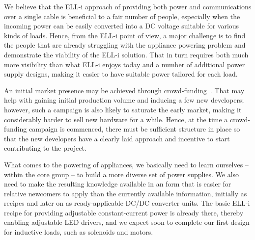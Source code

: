 \documentclass[final]{siamltex}
\begin{document}
We believe that the ELL-i approach of providing both power and
communications over a single cable is beneficial to a fair number of
people, especially when the incoming power can be easily converted
into a DC voltage suitable for various kinds of loads.  Hence, from
the ELL-i point of view, a major challenge is to find the people that
are already struggling with the appliance powering problem and
demonstrate the viability of the ELL-i solution.  That in turn
requires both much more visibility than what ELL-i enjoys today and a
number of additional power supply designs, making it easier to have
suitable power tailored for each load.

An initial market presence may be achieved through
crowd-funding~\cite{kuppuswamy2013crowdfunding}.  That may help
with gaining initial production volume and inducing a few new
developers; however, such a campaign is also likely to saturate the
early market, making it considerably harder to sell new hardware for a
while.  Hence, at the time a crowd-funding campaign is commenced,
there must be sufficient structure in place so that the new developers
have a clearly laid approach and incentive to start contributing to
the project.

What comes to the powering of appliances, we basically need to learn
ourselves -- within the core group -- to build a more diverse set of
power supplies.  We also need to make the resulting knowledge
available in an form that is easier for relative newcomers to apply
than the currently available information, initially as recipes and
later on as ready-applicable DC/DC converter units.  The basic ELL-i
recipe for providing adjustable constant-current power is already
there, thereby enabling adjustable LED drivers, and we expect soon to
complete our first design for inductive loads, such as solenoids and
motors.
\end{document}
